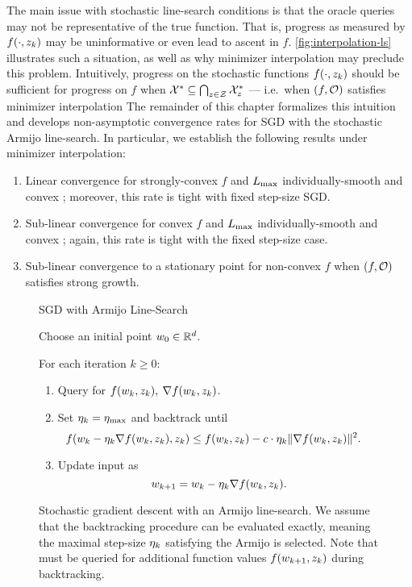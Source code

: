 The main issue with stochastic line-search conditions is that the oracle queries may not be representative of the true function. 
That is, progress as measured by \( f(\cdot, \zk) \) may be uninformative or even lead to ascent in \( f \). 
\autoref{fig:interpolation-ls} illustrates such a situation, as well as why minimizer interpolation may preclude this problem. 
Intuitively, progress on the stochastic functions \( f(\cdot, \zk) \) should be sufficient for progress on \( f \) when \( \calX^* \subseteq \bigcap_{\z \in \calZ} \calX^*_{\z} \) --- i.e.\ when \( \rbr{f, \oracle{}} \) satisfies minimizer interpolation 
The remainder of this chapter formalizes this intuition and develops non-asymptotic convergence rates for \ac{SGD} with the stochastic Armijo line-search. 
In particular, we establish the following results under minimizer interpolation:
\begin{enumerate}
    \item Linear convergence for strongly-convex \( f \) and \( \Lmax \) individually-smooth and convex \oracle{}; moreover, this rate is tight with fixed step-size \ac{SGD}. 
    \item Sub-linear convergence for convex \( f \) and \( \Lmax \) individually-smooth and convex \oracle{}; again, this rate is tight with the fixed step-size case.
    \item Sub-linear convergence to a stationary point for non-convex \( f \) when \( \rbr{f, \oracle{}} \) satisfies strong growth.
\end{enumerate}

\begin{figure}[t]
\begin{procedure}{\ac{SGD} with Armijo Line-Search}
\item Choose an initial point \( \w_0 \in \R^d \).
\item For each iteration \( k \geq 0 \):
    \begin{enumerate}
        \item Query \oracle{} for \( f(\wk, \zk), \: \grad(\wk, \zk) \). 
        \item Set \( \etak =  \etamax \) and backtrack until 
            \[  \hspace{-1em} f(\wk - \etak \grad(\wk, \zk), \zk) \leq f(\wk, \zk) - c \cdot \etak \norm{\grad(\wk, \zk)}^2. \]
        \item Update input as\vspace{-1ex}%
            \[ \wkk = \wk - \etak \grad(\wk, \zk). \]
    \end{enumerate}
\end{procedure}
\caption{Stochastic gradient descent with an Armijo line-search. We assume that the backtracking procedure can be evaluated exactly, meaning the maximal step-size \( \etak \) satisfying the Armijo is selected. Note that \oracle{} must be queried for additional function values \( f(\wkk, \zk) \) during backtracking.}%
\label{procedure:armijo-ls}
\end{figure}

